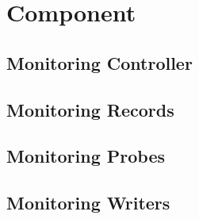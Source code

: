 %


\chapter{\KiekerMonitoringPart{} Component}\label{chap:componentsMonitoring}


\section{Monitoring Controller}\label{sec:componentsMonitoring:monitoringController}

\section{Monitoring Records}\label{sec:componentsMonitoring:monitoringRecords}



\section{Monitoring Probes}\label{sec:monitoring:probe}



\section{Monitoring Writers}\label{sec:monitoring-log-writers}


